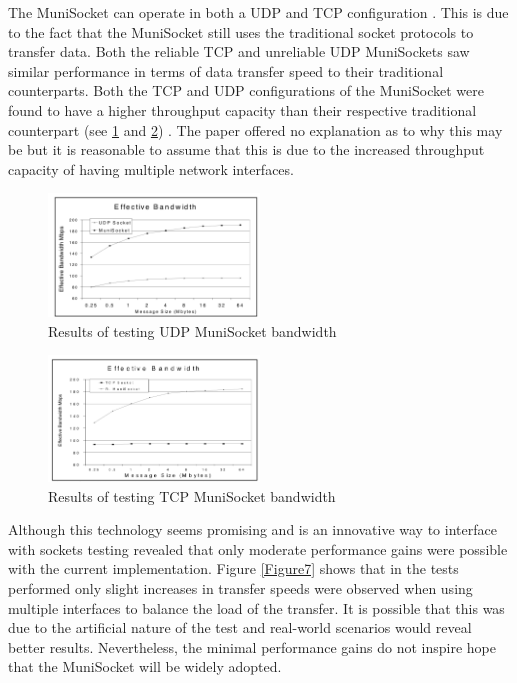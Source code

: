 \documentclass[conference, 12pt]{IEEEtran}
\begin{document}
The MuniSocket can operate in both a UDP and TCP configuration \cite{mohamed2002user}. This is due to the fact that the MuniSocket still uses the traditional socket protocols to transfer data. Both the reliable TCP and unreliable UDP MuniSockets saw similar performance in terms of data transfer speed to their traditional counterparts. Both the TCP and UDP configurations of the MuniSocket were found to have a higher throughput capacity than their respective traditional counterpart (see \ref{Figure5} and \ref{Figure6}) \cite{mohamed2002user}. The paper offered no explanation as to why this may be but it is reasonable to assume that this is due to the increased throughput capacity of having multiple network interfaces.

\begin{figure}[htbp]
    \centering
    \centerline{\includegraphics[width=0.5\textwidth]{Figure5.png}}
    \caption{Results of testing UDP MuniSocket bandwidth \cite{mohamed2002user}}
    \label{Figure5}
\end{figure}
\begin{figure}[htbp]
    \centering
    \centerline{\includegraphics[width=0.5\textwidth]{Figure6.png}}
    \caption{Results of testing TCP MuniSocket bandwidth \cite{mohamed2002user}}
    \label{Figure6}
\end{figure}

Although this technology seems promising and is an innovative way to interface with sockets testing revealed that only moderate performance gains were possible with the current implementation. Figure \ref{Figure7} shows that in the tests performed only slight increases in transfer speeds were observed when using multiple interfaces to balance the load of the transfer. It is possible that this was due to the artificial nature of the test and real-world scenarios would reveal better results. Nevertheless, the minimal performance gains do not inspire hope that the MuniSocket will be widely adopted.
\end{document}
